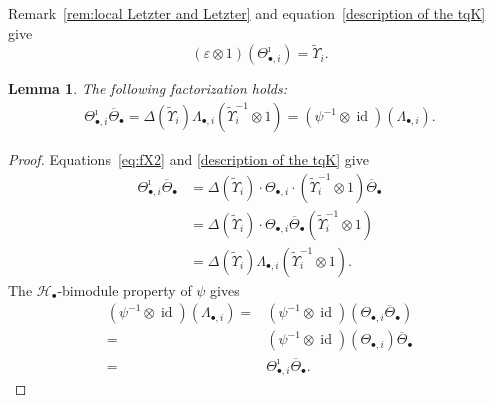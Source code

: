 \documentclass[a4paper,reqno,12pt]{amsart}
\numberwithin{equation}{section}
\newtheorem{lemma}[proposition]{Lemma}
\theoremstyle{definition}
\theoremstyle{plain}
\theoremstyle{definition}
\def\tfX{\widetilde\Upsilon}
\def\cH{\mathcal H}
\def \ov{\overline}
\newcommand{\id}{\operatorname{id}}
\begin{document}
Remark~\ref{rem:local Letzter and Letzter} and equation~\eqref{description of the tqK} give
\begin{equation}\label{local-tensor to K}
    (\varepsilon\otimes 1)(\Theta_{\bullet,i}^{\imath})=\tfX_i.
\end{equation}
\begin{lemma}
\label{lem:tensor-factorization}
The following factorization holds:
\begin{align}
    \Theta_{\bullet,i}^{\imath}\overline\Theta_\bullet=\Delta(\tfX_i)\Lambda_{\bullet,i}(\tfX_i^{-1}\otimes1)=(\psi^{-1}\otimes\id)(\Lambda_{\bullet,i}).\label{eq:tensor-factorization}
\end{align}
\end{lemma}
\begin{proof}
Equations~\eqref{eq:fX2} and \eqref{description of the tqK} give 
\begin{align*}
    \Theta_{\bullet,i}^{\imath}\overline\Theta_\bullet&=\Delta(\tfX_i)\cdot \Theta_{\bullet,i}\cdot(\tfX_i^{-1}\otimes 1)\ov{\Theta}_\bullet\\
    &=\Delta(\tfX_i)\cdot \Theta_{\bullet,i}\ov{\Theta}_\bullet(\tfX_i^{-1}\otimes 1)
    \\
    &=\Delta(\tfX_i)\Lambda_{\bullet,i}(\tfX_i^{-1}\otimes1).
\end{align*}
The $\cH_\bullet$-bimodule property of $\psi$ gives 
\begin{align*}
    (\psi^{-1}\otimes\id)(\Lambda_{\bullet,i})=&(\psi^{-1}\otimes\id)(\Theta_{\bullet,i}\ov{\Theta}_\bullet)
    \\
    =&(\psi^{-1}\otimes\id)(\Theta_{\bullet,i})\ov{\Theta}_\bullet
    \\
    =&\Theta_{\bullet,i}^{\imath}\overline\Theta_\bullet.
\end{align*}
\end{proof}
\end{document}
